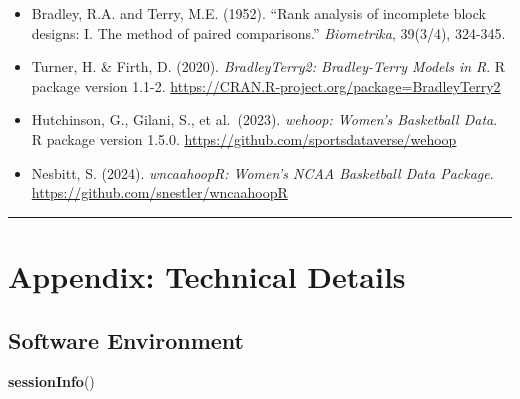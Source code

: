 \documentclass[
]{article}
\newenvironment{Shaded}{\begin{snugshade}}{\end{snugshade}}
\newcommand{\FunctionTok}[1]{\textcolor[rgb]{0.13,0.29,0.53}{\textbf{#1}}}
\newcommand{\NormalTok}[1]{#1}
\providecommand{\tightlist}{%
  \setlength{\itemsep}{0pt}\setlength{\parskip}{0pt}}
\begin{document}
\begin{itemize}
\tightlist
\item
  Bradley, R.A. and Terry, M.E. (1952). ``Rank analysis of incomplete
  block designs: I. The method of paired comparisons.''
  \emph{Biometrika}, 39(3/4), 324-345.
\item
  Turner, H. \& Firth, D. (2020). \emph{BradleyTerry2: Bradley-Terry
  Models in R}. R package version 1.1-2.
  \url{https://CRAN.R-project.org/package=BradleyTerry2}
\item
  Hutchinson, G., Gilani, S., et al.~(2023). \emph{wehoop: Women's
  Basketball Data}. R package version 1.5.0.
  \url{https://github.com/sportsdataverse/wehoop}
\item
  Nesbitt, S. (2024). \emph{wncaahoopR: Women's NCAA Basketball Data
  Package}. \url{https://github.com/snestler/wncaahoopR}
\end{itemize}

\begin{center}\rule{0.5\linewidth}{0.5pt}\end{center}

\section*{Appendix: Technical Details}\label{appendix-technical-details}

\subsection{Software Environment}\label{software-environment}

\begin{Shaded}
\begin{Highlighting}[]
\FunctionTok{sessionInfo}\NormalTok{()}
\end{Highlighting}
\end{Shaded}
\end{document}
